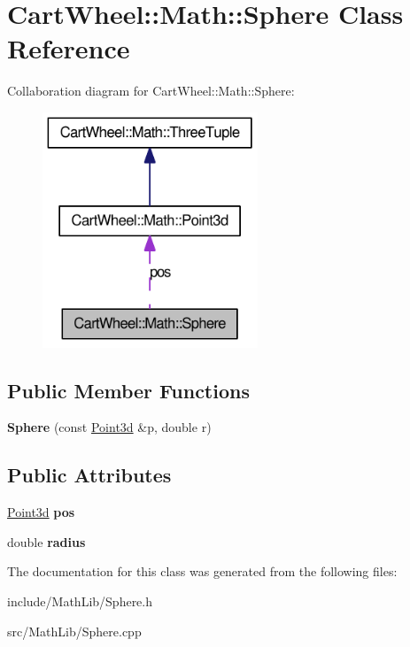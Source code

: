 \hypertarget{classCartWheel_1_1Math_1_1Sphere}{
\section{CartWheel::Math::Sphere Class Reference}
\label{classCartWheel_1_1Math_1_1Sphere}
}


Collaboration diagram for CartWheel::Math::Sphere:\nopagebreak
\begin{figure}[H]
\begin{center}
\leavevmode
\includegraphics[width=182pt]{classCartWheel_1_1Math_1_1Sphere__coll__graph}
\end{center}
\end{figure}
\subsection*{Public Member Functions}
\begin{DoxyCompactItemize}
\item 
\hypertarget{classCartWheel_1_1Math_1_1Sphere_a0709a5153872849ddf35a5d28b9a11d7}{
{\bfseries Sphere} (const \hyperlink{classCartWheel_1_1Math_1_1Point3d}{Point3d} \&p, double r)}
\label{classCartWheel_1_1Math_1_1Sphere_a0709a5153872849ddf35a5d28b9a11d7}

\end{DoxyCompactItemize}
\subsection*{Public Attributes}
\begin{DoxyCompactItemize}
\item 
\hypertarget{classCartWheel_1_1Math_1_1Sphere_a51d1a16512e191e57a8bd9563839eee9}{
\hyperlink{classCartWheel_1_1Math_1_1Point3d}{Point3d} {\bfseries pos}}
\label{classCartWheel_1_1Math_1_1Sphere_a51d1a16512e191e57a8bd9563839eee9}

\item 
\hypertarget{classCartWheel_1_1Math_1_1Sphere_a5fb82100dd124104569ac667b79e0215}{
double {\bfseries radius}}
\label{classCartWheel_1_1Math_1_1Sphere_a5fb82100dd124104569ac667b79e0215}

\end{DoxyCompactItemize}


The documentation for this class was generated from the following files:\begin{DoxyCompactItemize}
\item 
include/MathLib/Sphere.h\item 
src/MathLib/Sphere.cpp\end{DoxyCompactItemize}
